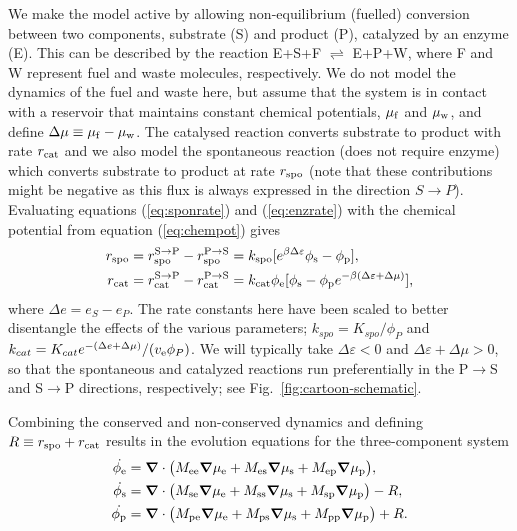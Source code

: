 We make the model active by allowing non-equilibrium (fuelled) conversion between two components, substrate (S) and product (P), catalyzed by an enzyme (E). This can be described by the reaction E+S+F $\rightleftharpoons$ E+P+W, where F and W represent fuel and waste molecules, respectively. We do not model the dynamics of the fuel and waste here, but assume that the system is in contact with a reservoir that maintains constant chemical potentials, $\mu_{\mathrm{f}}$ and $\mu_{\mathrm{w}}$, and define $\Delta\mu \equiv \mu_{\mathrm{f}}-\mu_{\mathrm{w}}$. The catalysed reaction converts substrate to product with rate $r_{\mathrm{cat}}$ and we also model the spontaneous reaction (does not require enzyme) which converts substrate to product at rate $r_{\mathrm{spo}}$ (note that these contributions might be negative as this flux is always expressed in the direction $S \rightarrow P$). Evaluating equations (\ref{eq:sponrate}) and (\ref{eq:enzrate}) with the chemical potential from equation (\ref{eq:chempot}) gives
\begin{align}
    r_{\mathrm{spo}} &= r_{\mathrm{spo}}^{\mathrm{S}\to\mathrm{P}} - r_{\mathrm{spo}}^{\mathrm{P}\to\mathrm{S}} = k_{\mathrm{spo}}[e^{\beta \Delta \varepsilon}\phi_{\mathrm{s}} - \phi_{\mathrm{p}}],\\
    r_{\mathrm{cat}} &= r_{\mathrm{cat}}^{\mathrm{S}\to\mathrm{P}} - r_{\mathrm{cat}}^{\mathrm{P}\to\mathrm{S}} = k_{\mathrm{cat}}\phi_{\mathrm{e}}[\phi_{\mathrm{s}}-\phi_{\mathrm{p}} e^{-\beta(\Delta \varepsilon+ \Delta\mu)}],
    \label{r_cat}
\end{align}
where $\Delta e = e_S - e_P$. The rate constants here have been scaled to better disentangle the effects of the various parameters; $k_{spo} = K_{spo}/\phi_P$ and $k_{cat} = K_{cat}e^{-(\Delta e + \Delta \mu)}/(v_{\mathrm{e}} \phi_P)$. We will typically take $\Delta \varepsilon<0$ and $\Delta \varepsilon + \Delta \mu>0$, so that the spontaneous and catalyzed reactions run preferentially in the P$\to$S and S$\to$P directions, respectively; see Fig.~\ref{fig:cartoon-schematic}.

Combining the conserved and non-conserved dynamics and defining $R\equiv r_{\mathrm{spo}}+r_{\mathrm{cat}}$ results in the evolution equations for the three-component system
\begin{align}
    \dot{\phi_{\mathrm{e}}} &= \bm{\nabla} \cdot \big(M_{\mathrm{ee}}\bm{\nabla}\mu_{\mathrm{e}} + M_{\mathrm{es}}\bm{\nabla}\mu_{\mathrm{s}} + M_{\mathrm{ep}}\bm{\nabla}\mu_{\mathrm{p}}\big), \label{evoE}\\
    \dot{\phi_{\mathrm{s}}} &= \bm{\nabla} \cdot \big(M_{\mathrm{se}}\bm{\nabla}\mu_{\mathrm{e}} + M_{\mathrm{ss}}\bm{\nabla}\mu_{\mathrm{s}} + M_{\mathrm{sp}}\bm{\nabla}\mu_{\mathrm{p}}\big) - R, \label{evoS}\\
    \dot{\phi_{\mathrm{p}}} &= \bm{\nabla} \cdot \big(M_{\mathrm{pe}}\bm{\nabla}\mu_{\mathrm{e}} + M_{\mathrm{ps}}\bm{\nabla}\mu_{\mathrm{s}} + M_{\mathrm{pp}}\bm{\nabla}\mu_{\mathrm{p}}\big) + R. \label{evoP}
\end{align}

